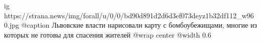  
 
 
 
 

\ifcmt
  ig https://strana.news/img/forall/u/0/0/bd90d891d2d6d3ef073deyz1b32df112_w960.jpg
  @caption Львовские власти нарисовали карту с бомбоубежищами, многие из которых не готовы для спасения жителей
  @wrap center
  @width 0.6
\fi
